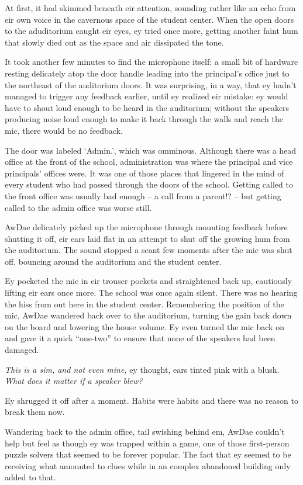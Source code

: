 At first, it had skimmed beneath eir attention, sounding rather like an echo from eir own voice in the cavernous space of the student center.  When the open doors to the aduditorium caught eir eyes, ey tried once more, getting another faint hum that slowly died out as the space and air dissipated the tone.

It took another few minutes to find the microphone itself: a small bit of hardware resting delicately atop the door handle leading into the principal's office just to the northeast of the auditorium doors.  It was surprising, in a way, that ey hadn't managed to trigger any feedback earlier, until ey realized eir mistake: ey would have to shout loud enough to be heard in the auditorium; without the speakers producing noise loud enough to make it back through the walls and reach the mic, there would be no feedback.

The door was labeled `Admin.', which was omminous.  Although there was a head office at the front of the school, administration was where the principal and vice principals' offices were.  It was one of those places that lingered in the mind of every student who had passed through the doors of the school.  Getting called to the front office was usually bad enough -- a call from a parent!? -- but getting called to the admin office was worse still.

AwDae delicately picked up the microphone through mounting feedback before shutting it off, eir ears laid flat in an attempt to shut off the growing hum from the auditorium.  The sound stopped a scant few moments after the mic was shut off, bouncing around the auditorium and the student center.

Ey pocketed the mic in eir trouser pockets and straightened back up, cautiously lifting eir ears once more.  The school was once again silent.  There was no hearing the hiss from out here in the student center.  Remembering the position of the mic, AwDae wandered back over to the auditorium, turning the gain back down on the board and lowering the house volume.  Ey even turned the mic back on and gave it a quick ``one-two'' to ensure that none of the speakers had been damaged.

\textit{This is a sim, and not even mine,} ey thought, ears tinted pink with a blush.  \textit{What does it matter if a speaker blew?}

Ey shrugged it off after a moment.  Habits were habits and there was no reason to break them now.

Wandering back to the admin office, tail swishing behind em, AwDae couldn't help but feel as though ey was trapped within a game, one of those first-person puzzle solvers that seemed to be forever popular.  The fact that ey seemed to be receiving what amounted to clues while in an complex abandoned building only added to that.

